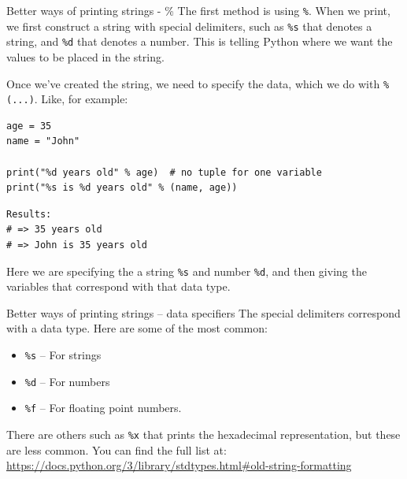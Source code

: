 \documentclass[10pt]{beamer}
\begin{document}
\begin{frame}[label={sec:org51dd901},fragile]{Better ways of printing strings - \%}
 The first method is using \texttt{\%}. When we print, we first construct a string with special
delimiters, such as \texttt{\%s} that denotes a string, and \texttt{\%d} that denotes a number. This is
telling Python where we want the values to be placed in the string.

Once we've created the string, we need to specify the data, which we do with \texttt{\%
(...)}. Like, for example:

\begin{verbatim}
age = 35
name = "John"

print("%d years old" % age)  # no tuple for one variable
print("%s is %d years old" % (name, age)) 
\end{verbatim}

\begin{verbatim}
Results: 
# => 35 years old
# => John is 35 years old
\end{verbatim}


Here we are specifying the a string \texttt{\%s} and number \texttt{\%d}, and then giving the variables
that correspond with that data type.
\end{frame}

\begin{frame}[label={sec:orgfa3a80a},fragile]{Better ways of printing strings -- data specifiers}
 The special delimiters correspond with a data type. Here are some of the most common:

\begin{itemize}
\item \texttt{\%s} -- For strings
\item \texttt{\%d} -- For numbers
\item \texttt{\%f} -- For floating point numbers.
\end{itemize}

There are others such as \texttt{\%x} that prints the hexadecimal representation, but these are
less common. You can find the full list at: \url{https://docs.python.org/3/library/stdtypes.html\#old-string-formatting}
\end{frame}
\end{document}

